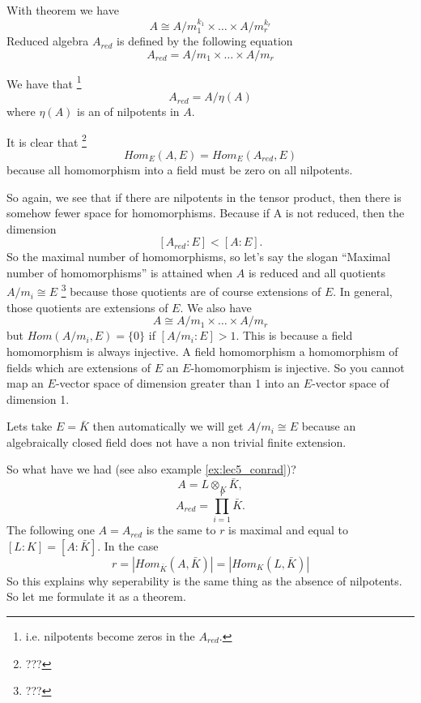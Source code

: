\begin{definition}
  With  theorem we have
  \[
  A \cong A/m_1^{k_1} \times \dots \times A/m_r^{k_r}
  \]
  Reduced algebra $A_{red}$ is defined by the following equation
  \[
  A_{red} = A/m_1 \times \dots \times A/m_r
  \]
  \label{def:reducedalgebra}
\end{definition}

We have that
\footnote{
  i.e. nilpotents become zeros in the $A_{red}$.
}
\[
A_{red} = A /\eta\left(A\right)
\]
where $\eta\left(A\right)$ is an  of
nilpotents in $A$.

It is clear that
\footnote{
  ???
}
\[
Hom_E\left(A, E\right) =
Hom_E\left(A_{red}, E\right)
\]
because all homomorphism into a field must be zero on all nilpotents. 

So again, we see that if there are nilpotents in the tensor product,
then there is somehow fewer space for homomorphisms. Because if A is
not reduced, then the dimension
\[
\left[A_{red} : E\right] < \left[A : E\right].
\]
So the maximal number of homomorphisms, so let's say the slogan
``Maximal number of homomorphisms'' is attained when $A$ is reduced
and all quotients $A/m_i \cong E$
\footnote{
  ???
}
because those quotients are of
course extensions of $E$. In general,    
those quotients are extensions of $E$. We also have
\[
A \cong A/m_1 \times \dots \times A/m_r
\]
but $Hom\left(A/m_i, E\right) = \{0\}$ if $\left[A/m_i: E\right] > 1$.  
This is because a field homomorphism is always injective. A field
homomorphism a homomorphism of fields which are extensions of $E$  an
$E$-homomorphism is injective. So you cannot map an $E$-vector space of
dimension greater than 1 into an $E$-vector space of dimension 1.

Lets take $E = \bar{K}$ then automatically we will get
$A/m_i \cong E$ because an algebraically closed field does not have a
non trivial finite extension.

So what have we had (see also example \ref{ex:lec5_conrad})?
\[
A = L \otimes_K \bar{K},
\]
\[
A_{red} = \prod_{i=1}^r \bar{K}.
\]
The following one $A = A_{red}$ is the same to $r$ is maximal and
equal to $\left[L:K\right] = \left[A: \bar{K}\right]$. In the case
\[
r = \left|Hom_{\bar{K}}\left(A, \bar{K}\right)\right| = 
\left|Hom_K\left(L, \bar{K}\right)\right|
\]
So this explains why seperability is the same thing as the absence of
nilpotents. So let me formulate it as a theorem.

